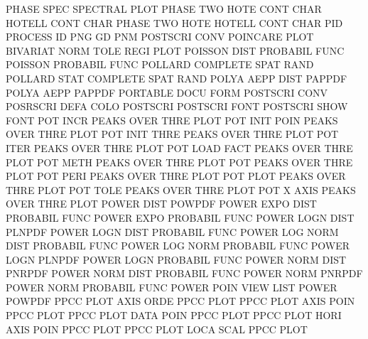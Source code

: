 PHASE    SPEC                           SPECTRAL PLOT
PHASE    TWO  HOTE CONT CHAR            HOTELL   CONT CHAR
PHASE    TWO  HOTE                      HOTELL   CONT CHAR
PID                                     PROCESS  ID
PNG                                     GD
PNM                                     POSTSCRI CONV
POINCARE PLOT                           BIVARIAT NORM TOLE REGI PLOT
POISSON  DIST                           PROBABIL FUNC
POISSON                                 PROBABIL FUNC
POLLARD                                 COMPLETE SPAT RAND
POLLARD  STAT                           COMPLETE SPAT RAND
POLYA    AEPP DIST                      PAPPDF
POLYA    AEPP                           PAPPDF
PORTABLE DOCU FORM                      POSTSCRI CONV
POSRSCRI DEFA COLO                      POSTSCRI
POSTSCRI FONT                           POSTSCRI SHOW FONT
POT      INCR                           PEAKS    OVER THRE PLOT
POT      INIT POIN                      PEAKS    OVER THRE PLOT
POT      INIT THRE                      PEAKS    OVER THRE PLOT
POT      ITER                           PEAKS    OVER THRE PLOT
POT      LOAD FACT                      PEAKS    OVER THRE PLOT
POT      METH                           PEAKS    OVER THRE PLOT
POT                                     PEAKS    OVER THRE PLOT
POT      PERI                           PEAKS    OVER THRE PLOT
POT      PLOT                           PEAKS    OVER THRE PLOT
POT      TOLE                           PEAKS    OVER THRE PLOT
POT      X    AXIS                      PEAKS    OVER THRE PLOT
POWER    DIST                           POWPDF
POWER    EXPO DIST                      PROBABIL FUNC
POWER    EXPO                           PROBABIL FUNC
POWER    LOGN DIST                      PLNPDF
POWER    LOGN DIST                      PROBABIL FUNC
POWER    LOG  NORM DIST                 PROBABIL FUNC
POWER    LOG  NORM                      PROBABIL FUNC
POWER    LOGN                           PLNPDF
POWER    LOGN                           PROBABIL FUNC
POWER    NORM DIST                      PNRPDF
POWER    NORM DIST                      PROBABIL FUNC
POWER    NORM                           PNRPDF
POWER    NORM                           PROBABIL FUNC
POWER    POIN VIEW                      LIST
POWER                                   POWPDF
PPCC     PLOT AXIS ORDE                 PPCC     PLOT
PPCC     PLOT AXIS POIN                 PPCC     PLOT
PPCC     PLOT DATA POIN                 PPCC     PLOT
PPCC     PLOT HORI AXIS POIN            PPCC     PLOT
PPCC     PLOT LOCA SCAL                 PPCC     PLOT
